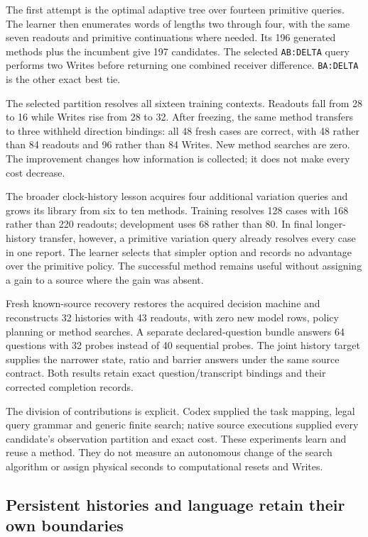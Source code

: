 The first attempt is the optimal adaptive tree over fourteen primitive queries. The learner then enumerates words of lengths two through four, with the same seven readouts and primitive continuations where needed. Its 196 generated methods plus the incumbent give 197 candidates. The selected \texttt{AB:DELTA} query performs two Writes before returning one combined receiver difference. \texttt{BA:DELTA} is the other exact best tie.

The selected partition resolves all sixteen training contexts. Readouts fall from 28 to 16 while Writes rise from 28 to 32. After freezing, the same method transfers to three withheld direction bindings: all 48 fresh cases are correct, with 48 rather than 84 readouts and 96 rather than 84 Writes. New method searches are zero. The improvement changes how information is collected; it does not make every cost decrease.

The broader clock-history lesson acquires four additional variation queries and grows its library from six to ten methods. Training resolves 128 cases with 168 rather than 220 readouts; development uses 68 rather than 80. In final longer-history transfer, however, a primitive variation query already resolves every case in one report. The learner selects that simpler option and records no advantage over the primitive policy. The successful method remains useful without assigning a gain to a source where the gain was absent.

Fresh known-source recovery restores the acquired decision machine and reconstructs 32 histories with 43 readouts, with zero new model rows, policy planning or method searches. A separate declared-question bundle answers 64 questions with 32 probes instead of 40 sequential probes. The joint history target supplies the narrower state, ratio and barrier answers under the same source contract. Both results retain exact question/transcript bindings and their corrected completion records.

The division of contributions is explicit. Codex supplied the task mapping, legal query grammar and generic finite search; native source executions supplied every candidate's observation partition and exact cost. These experiments learn and reuse a method. They do not measure an autonomous change of the search algorithm or assign physical seconds to computational resets and Writes.

\subsection{Persistent histories and language retain their own boundaries}
\label{v3-runtime-history-language}

